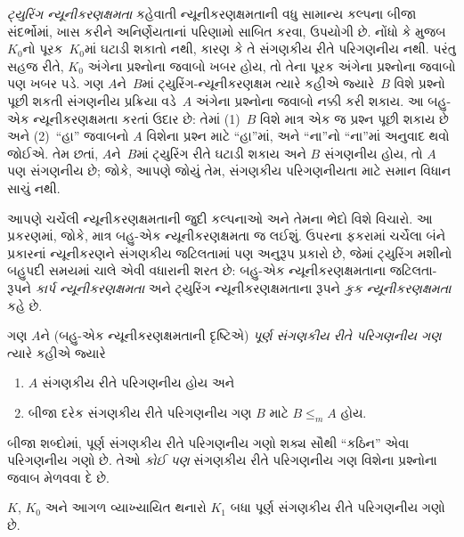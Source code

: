 \begin{digress}
\emph{ટ્યુરિંગ ન્યૂનીકરણક્ષમતા} કહેવાતી ન્યૂનીકરણક્ષમતાની
વધુ સામાન્ય કલ્પના બીજા સંદર્ભોમાં, ખાસ કરીને
અનિર્ણેયતાનાં પરિણામો સાબિત કરવા, ઉપયોગી છે. નોંધો કે
 મુજબ $K_0$નો પૂરક~$K_0$માં
ઘટાડી શકાતો નથી, કારણ કે તે સંગણકીય રીતે પરિગણનીય નથી.
પરંતુ સહજ રીતે, $K_0$ અંગેના પ્રશ્નોના જવાબો ખબર હોય, તો
તેના પૂરક અંગેના પ્રશ્નોના જવાબો પણ ખબર પડે. ગણ $A$ને~$B$માં
ટ્યુરિંગ-ન્યૂનીકરણક્ષમ ત્યારે કહીએ જ્યારે~$B$ વિશે પ્રશ્નો
પૂછી શકતી સંગણનીય પ્રક્રિયા વડે~$A$ અંગેના પ્રશ્નોના જવાબો
નક્કી કરી શકાય. આ બહુ-એક ન્યૂનીકરણક્ષમતા કરતાં ઉદાર છે:
તેમાં (1)~$B$ વિશે માત્ર એક જ પ્રશ્ન પૂછી શકાય છે અને
(2)~``હા'' જવાબનો $A$ વિશેના પ્રશ્ન માટે ``હા''માં,
અને ``ના''નો ``ના''માં અનુવાદ થવો જોઈએ. તેમ છતાં,
$A$ને~$B$માં ટ્યુરિંગ રીતે ઘટાડી શકાય અને $B$ સંગણનીય
હોય, તો $A$ પણ સંગણનીય છે; જોકે, આપણે જોયું તેમ,
સંગણકીય પરિગણનીયતા માટે સમાન વિધાન સાચું નથી.

આપણે ચર્ચેલી ન્યૂનીકરણક્ષમતાની જુદી કલ્પનાઓ અને તેમના
ભેદો વિશે વિચારો. આ પ્રકરણમાં, જોકે, માત્ર બહુ-એક
ન્યૂનીકરણક્ષમતા જ લઈશું. ઉપરના ફકરામાં ચર્ચેલા બંને પ્રકારનાં
ન્યૂનીકરણને સંગણકીય જટિલતામાં પણ અનુરૂપ પ્રકારો છે, જેમાં
ટ્યુરિંગ મશીનો બહુપદી સમયમાં ચાલે એવી વધારાની શરત છે:
બહુ-એક ન્યૂનીકરણક્ષમતાના જટિલતા-રૂપને \emph{કાર્પ
ન્યૂનીકરણક્ષમતા} અને ટ્યુરિંગ ન્યૂનીકરણક્ષમતાના રૂપને
\emph{કુક ન્યૂનીકરણક્ષમતા} કહે છે.
\end{digress}
\endgroup


\begingroup
\makeatletter{}\makeatother

\label{guunit:OLP-0245}


\begin{defn}
ગણ $A$ને (બહુ-એક ન્યૂનીકરણક્ષમતાની દૃષ્ટિએ)
\emph{પૂર્ણ સંગણકીય રીતે પરિગણનીય ગણ} ત્યારે કહીએ જ્યારે
\begin{enumerate}
\item $A$ સંગણકીય રીતે પરિગણનીય હોય અને
\item બીજા દરેક સંગણકીય રીતે પરિગણનીય ગણ $B$ માટે $B \leq_m A$ હોય.
\end{enumerate}
\end{defn}

બીજા શબ્દોમાં, પૂર્ણ સંગણકીય રીતે પરિગણનીય ગણો શક્ય
સૌથી ``કઠિન'' એવા પરિગણનીય ગણો છે. તેઓ \emph{કોઈ પણ}
સંગણકીય રીતે પરિગણનીય ગણ વિશેના પ્રશ્નોના જવાબ મેળવવા દે છે.

\begin{thm}
$K$, $K_0$ અને આગળ વ્યાખ્યાયિત થનારો $K_1$ બધા પૂર્ણ
સંગણકીય રીતે પરિગણનીય ગણો છે.
\end{thm}

